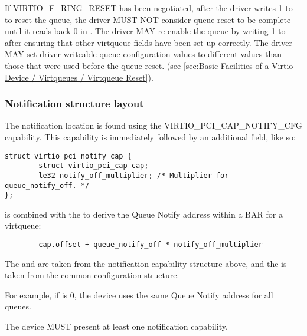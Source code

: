 If VIRTIO_F_RING_RESET has been negotiated, after the driver writes 1 to
 to reset the queue, the driver MUST NOT consider queue
reset to be complete until it reads back 0 in . The driver
MAY re-enable the queue by writing 1 to  after ensuring
that other virtqueue fields have been set up correctly. The driver MAY set
driver-writeable queue configuration values to different values than those that
were used before the queue reset.
(see \ref{sec:Basic Facilities of a Virtio Device / Virtqueues / Virtqueue Reset}).

\subsubsection{Notification structure layout}\label{sec:Virtio Transport Options / Virtio Over PCI Bus / PCI Device Layout / Notification capability}

The notification location is found using the VIRTIO_PCI_CAP_NOTIFY_CFG
capability.  This capability is immediately followed by an additional
field, like so:

\begin{lstlisting}
struct virtio_pci_notify_cap {
        struct virtio_pci_cap cap;
        le32 notify_off_multiplier; /* Multiplier for queue_notify_off. */
};
\end{lstlisting}

 is combined with the  to
derive the Queue Notify address within a BAR for a virtqueue:

\begin{lstlisting}
        cap.offset + queue_notify_off * notify_off_multiplier
\end{lstlisting}

The  and  are taken from the
notification capability structure above, and the  is
taken from the common configuration structure.

\begin{note}
For example, if  is 0, the device uses
the same Queue Notify address for all queues.
\end{note}

The device MUST present at least one notification capability.

